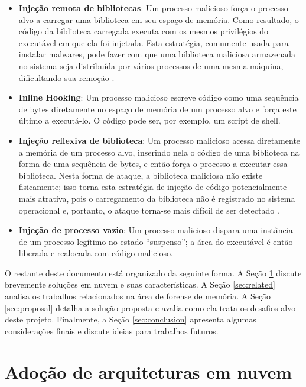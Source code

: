 \documentclass[conference]{IEEEtran}
\begin{document}
\begin{itemize}
 \item \textbf{Injeção remota de bibliotecas}: Um processo malicioso força o processo alvo a carregar uma biblioteca em seu espaço de memória.
 Como resultado, o código da biblioteca carregada executa com os mesmos privilégios do executável em que ela foi injetada. 
 Esta estratégia, comumente usada para instalar malwares, pode fazer com que uma biblioteca maliciosa armazenada no sistema seja distribuída por vários processos de uma mesma máquina, dificultando sua remoção \cite{Miller_Remote_Library_Injection:2004}.
 \item \textbf{Inline Hooking}: Um processo malicioso escreve código como uma sequência de bytes diretamente no espaço de memória de um processo alvo e força este último a executá-lo. 
 O código pode ser, por exemplo, um script de shell.
 \item \textbf{Injeção reflexiva de biblioteca}: Um processo malicioso acessa diretamente a memória de um processo alvo, inserindo nela o código de uma biblioteca na forma de uma sequência de bytes, e então força o processo a executar essa biblioteca. 
 Nesta forma de ataque, a biblioteca maliciosa não existe fisicamente; isso torna esta estratégia de injeção de código potencialmente mais atrativa, pois o carregamento da biblioteca não é registrado no sistema operacional e, portanto, o ataque torna-se mais difícil de ser detectado \cite{Fewer_Reflective_Library_Inject:2008}.
 \item \textbf{Injeção de processo vazio}: Um processo malicioso dispara uma instância de um processo legítimo no estado ``suspenso''; a área do executável é então liberada e realocada com código malicioso.
\end{itemize}


O restante deste documento está organizado da seguinte forma.
%
A Seção \ref{sec:cloud} discute brevemente soluções em nuvem e suas características.
%
A Seção \ref{sec:related} analisa os trabalhos relacionados na área de forense de memória.
%
A Seção \ref{sec:proposal} detalha a solução proposta e avalia como ela trata os desafios alvo deste projeto.
%
Finalmente, a Seção \ref{sec:conclusion} apresenta algumas considerações finais e discute ideias para trabalhos futuros.


\section{Adoção de arquiteturas em nuvem}
\label{sec:cloud}
\end{document}
